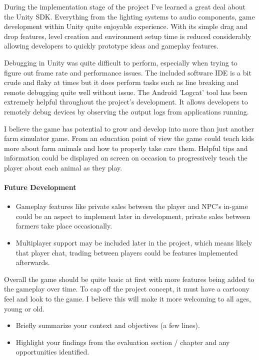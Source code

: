 During the implementation stage of the project I've learned a great deal about the Unity SDK. Everything from the lighting systems to audio components, game development within Unity quite enjoyable experience. With its simple drag and drop features, level creation and environment setup time is reduced considerably allowing developers to quickly prototype ideas and gameplay features.

Debugging in Unity was quite difficult to perform, especially when trying to figure out frame rate and performance issues. The included software IDE is a bit crude and flaky at times but it does perform tasks such as line breaking and remote debugging quite well without issue. The Android 'Logcat' tool has been extremely helpful throughout the project's development. It allows developers to remotely debug devices by observing the output logs from applications running. 

I believe the game has potential to grow and develop into more than just another farm simulator game. From an education point of view the game could teach kids more about farm animals and how to properly take care them. Helpful tips and information could be displayed on screen on occasion to progressively teach the player about each animal as they play.

\paragraph{Future Development}
\begin{itemize}
\item Gameplay features like private sales between the player and NPC's in-game could be an aspect to implement later in development, private sales between farmers take place occasionally. 
\item Multiplayer support may be included later in the project, which means likely that player chat, trading between players could be features implemented afterwards. 
\end{itemize}
Overall the game should be quite basic at first with more features being added to the gameplay over time. To cap off the project concept, it must have a cartoony feel and look to the game. I believe this will make it more welcoming to all ages, young or old.

\begin{itemize}
\item Briefly summarize your context and objectives (a few lines).
\item Highlight your findings from the evaluation section / chapter and any opportunities identified.
\end{itemize}